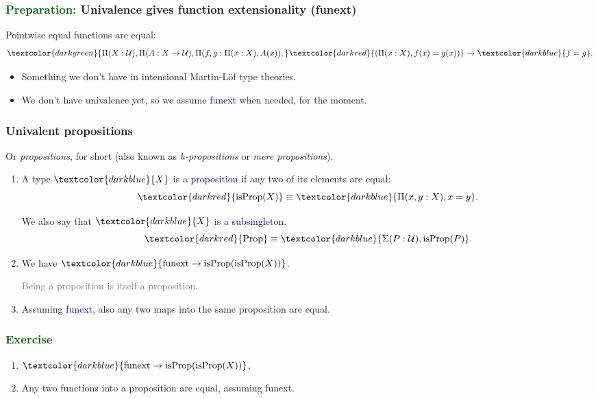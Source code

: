 \documentclass[aspectratio=169]{beamer}
\newcommand{\Prop}{\operatorname{Prop}}
\newcommand{\isProp}{\operatorname{isProp}}
\newcommand{\eqq}{\equiv}
\newcommand{\U}{\operatorname{\mathcal{U}}}
\newcommand{\db}{\textcolor{darkblue}}
\newcommand{\dg}{\textcolor{darkgreen}}
\newcommand{\grey}{\textcolor{grey}}
\newcommand{\dr}{\textcolor{darkred}}
\newcommand{\m}[1]{$\db{#1}$}
\newcommand{\MM}[1]{\[{#1}\]}
\begin{document}
 \begin{frame}
  \frametitle{\dg{Preparation:} Univalence gives function extensionality (funext)}

Pointwise equal functions are equal:
\[\dg{\Pi(X:\U), \Pi(A:X \to \U), \Pi(f,g:\Pi(x:X), A(x)),} \dr{(\Pi(x:X), f(x)=g(x))} \to \db{f=g}.\]

\begin{itemize}
\vfill \item
Something we don't have in intensional Martin-L\"of type theories.
\vfill \item
We don't have univalence yet, so we assume \db{funext} when needed, for the moment.
\end{itemize}

\end{frame}

\begin{frame}
  \frametitle{Univalent propositions}

Or \emph{propositions}, for short (also known as \emph{h-propositions} or \emph{mere propositions}).

\vfill

  \begin{enumerate}
  \vfill \item A type \m{X} is a \db{proposition} if any two of its elements are equal:
\MM{\dr{\isProp(X)} \eqq \db{\Pi(x,y:X), x=y}.}

\vfill

We also say that \m{X} is a \db{subsingleton}.
\MM{\dr{\Prop} \eqq \db{\Sigma(P:\U), \isProp(P)}.}

\vfill

  \vfill \item We have \m{\text{funext} \to \isProp(\isProp(X))}.

\vfill

  \grey{Being a proposition is itself a proposition.}

\vfill

\vfill \item Assuming \db{funext}, also any two maps into the same proposition are equal.

\end{enumerate}

\vfill

\end{frame}

\begin{frame} \frametitle{\dg{Exercise}}

  \begin{enumerate}
  \item  \m{\text{funext} \to \isProp(\isProp(X))}.
  \item Any two functions into a proposition are equal, assuming funext.
  \end{enumerate}

\end{frame}
\end{document}
